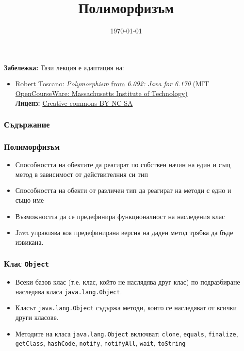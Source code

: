 \documentclass[ignorenonframetext, hyperref=unicode,compress]{beamer}
\title{Полиморфизъм}
\date{\today}
\begin{document}
\frame{\titlepage}

\begin{frame}
\small
{\bf Забележка:} Тази лекция е адаптация на:
\begin{itemize}
  \item \href{http://ocw.mit.edu/NR/rdonlyres/Electrical-Engineering-and-Computer-Science/6-092January--IAP--2006/66BAC837-433E-48A5-BA15-B766E0B7CDEA/0/lecture2a.pdf}{Robert Toscano: {\em Polymorphism}} from
\href{http://ocw.mit.edu/OcwWeb/Electrical-Engineering-and-Computer-Science/6-092January--IAP--2006/CourseHome/index.htm}{
{\em 6.092: Java for 6.170} (MIT OpenCourseWare:
Massachusetts Institute of Technology)}\\
{\bf Лиценз:}
\href{http://ocw.mit.edu/OcwWeb/web/terms/terms/index.htm\#cc}{Creative commons
BY-NC-SA}  

\end{itemize}

\end{frame}
\begin{frame}
\frametitle{Съдържание}
\tableofcontents %
\end{frame}

\begin{frame}[containsverbatim]\frametitle{Полиморфизъм}
\begin{itemize}
 \item Способността на обектите да реагират по собствен начин на един и същ метод в зависимост от действителния си тип
 \item Способността на обекти от различен тип да реагират на методи с едно и също име
 \item Възможността да се предефинира функционалност на наследения клас
 \item Java управлява коя предефинирана версия на даден метод трябва да бъде извикана.
\end{itemize}
\end{frame}

\begin{frame}[containsverbatim]\frametitle{Клас \lstinline{Object}}
\begin{itemize}
 \item Всеки базов клас (т.е. клас, който не наслядява друг клас) по подразбиране наследява класа \lstinline{java.lang.Object}.
 \item Класът \lstinline{java.lang.Object} съдържа методи, които се наследяват от всички други класове.
 \item Методите на класа \lstinline{java.lang.Object} включват: \lstinline{clone}, \lstinline{equals}, \lstinline{finalize}, \lstinline{getClass}, \lstinline{hashCode}, \lstinline{notify}, \lstinline{notifyAll}, \lstinline{wait}, \lstinline{toString}
\end{itemize}
\end{frame}
\end{document}

